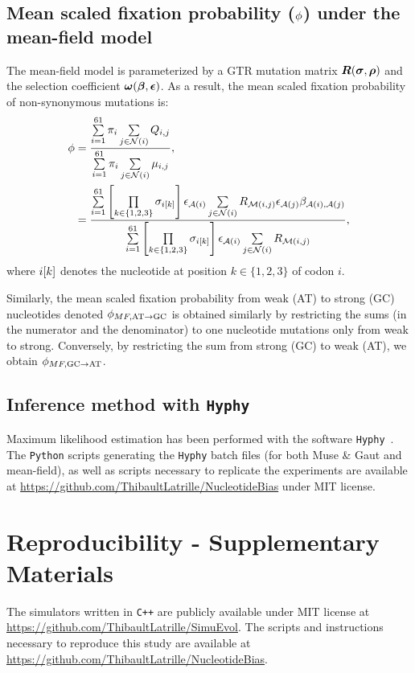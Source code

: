 \documentclass{article}
\begin{document}
\subsection{Mean scaled fixation probability (\texorpdfstring{$\phi$}{ϕ}) under the mean-field model}
\label{sec:mut-bias-mean-field-omega}
The mean-field model is parameterized by a {GTR} mutation matrix $\bm{R}(\bm{\sigma}, \bm{\rho})$ and the selection coefficient $\bm{\omega}(\bm{\beta}, \bm{\epsilon})$.
As a result, the mean scaled fixation probability of {non-synonymous} mutations is:
\begin{align}
 \phi & = \dfrac{ \sum\limits_{{i}=1}^{61} \pi_{{i}} \sum\limits_{{j} \in \mathcal{N}\left({i}\right)} Q_{{i}, {j}}}{ \sum\limits_{{i}=1}^{61} \pi_{{i}} \sum\limits_{{j} \in \mathcal{N}\left({i}\right)} \mu_{{i}, {j}}}, \\
 & = \dfrac{ \sum\limits_{{i}=1}^{61} \left[\prod\limits_{k \in \{ 1, 2, 3 \}} \sigma_{{i}[k]}\right] \epsilon_{\mathcal{A}({i})} \sum\limits_{{j} \in \mathcal{N}\left({i}\right)} R_{\mathcal{M}({i}, {j})} \epsilon_{\mathcal{A}({j})} \beta_{\mathcal{A}({i}), \mathcal{A}({j})} }{\sum\limits_{{i}=1}^{61} \left[\prod\limits_{k \in \{ 1, 2, 3 \}} \sigma_{{i}[k]}\right] \epsilon_{\mathcal{A}({i})} \sum\limits_{{j} \in \mathcal{N}\left({i}\right)} R_{\mathcal{M}({i}, {j})}},
\end{align}
where ${i}[k]$ denotes the nucleotide at position $k \in \{ 1, 2, 3 \}$ of codon $i$.

Similarly, the mean scaled fixation probability from weak (AT) to strong (GC) nucleotides denoted $\phi_{MF, \text{AT} \rightarrow \text{GC}}$ is obtained similarly by restricting the sums (in the numerator and the denominator) to one nucleotide mutations only from weak to strong.
Conversely, by restricting the sum from strong (GC) to weak (AT), we obtain $\phi_{MF, \text{GC} \rightarrow \text{AT}}$.

\subsection{Inference method with \texttt{Hyphy}}
\label{subsec:inference-method-with-hyphy}

Maximum {likelihood} estimation has been performed with the software \texttt{Hyphy}~\citep{Pond2005}.
The \texttt{Python} scripts generating the \texttt{Hyphy} batch files (for both Muse \& Gaut and mean-field), as well as scripts necessary to replicate the experiments are available at \url{https://github.com/ThibaultLatrille/NucleotideBias} under MIT license.

\section{Reproducibility - Supplementary Materials}
The simulators written in \texttt{C++} are publicly available under MIT license at \url{https://github.com/ThibaultLatrille/SimuEvol}.
The scripts and instructions necessary to reproduce this study are available at \url{https://github.com/ThibaultLatrille/NucleotideBias}.
\end{document}
